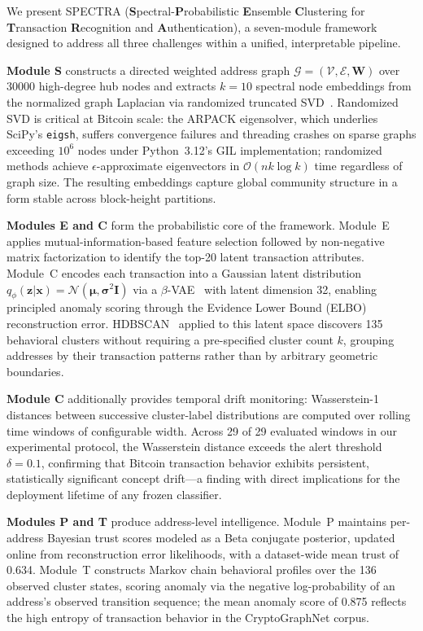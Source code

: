 We present \textsc{SPECTRA}
(\textbf{S}pectral-\textbf{P}robabilistic \textbf{E}nsemble \textbf{C}lustering
for \textbf{T}ransaction \textbf{R}ecognition and \textbf{A}uthentication),
a seven-module framework designed to address all three challenges within a
unified, interpretable pipeline.

\textbf{Module S} constructs a directed weighted address graph
$\mathcal{G} = (\mathcal{V}, \mathcal{E}, \mathbf{W})$ over \num{30000}
high-degree hub nodes and extracts $k=10$ spectral node embeddings from the
normalized graph Laplacian via randomized truncated SVD~\cite{Halko2011}.
Randomized SVD is critical at Bitcoin scale: the ARPACK eigensolver, which
underlies SciPy's \texttt{eigsh}, suffers convergence failures and threading
crashes on sparse graphs exceeding $10^6$ nodes under Python~3.12's GIL
implementation; randomized methods achieve $\epsilon$-approximate
eigenvectors in $\mathcal{O}(nk\log k)$ time regardless of graph size.
The resulting embeddings capture global community structure in a form stable
across block-height partitions.

\textbf{Modules E and C} form the probabilistic core of the framework.
Module~E applies mutual-information-based feature selection followed by
non-negative matrix factorization to identify the top-20 latent transaction
attributes.
Module~C encodes each transaction into a Gaussian latent distribution
$q_\phi(\mathbf{z}|\mathbf{x}) = \mathcal{N}(\boldsymbol{\mu}, \boldsymbol{\sigma}^2\mathbf{I})$
via a $\beta$-VAE~\cite{Kingma2014} with latent dimension \num{32},
enabling principled anomaly scoring through the Evidence Lower Bound (ELBO)
reconstruction error.
HDBSCAN~\cite{McInnes2017} applied to this latent space discovers \num{135}
behavioral clusters without requiring a pre-specified cluster count $k$,
grouping addresses by their transaction patterns rather than by arbitrary
geometric boundaries.

\textbf{Module C} additionally provides temporal drift monitoring: Wasserstein-1
distances between successive cluster-label distributions are computed over
rolling time windows of configurable width.
Across \num{29} of \num{29} evaluated windows in our experimental protocol,
the Wasserstein distance exceeds the alert threshold $\delta = 0.1$,
confirming that Bitcoin transaction behavior exhibits persistent, statistically
significant concept drift---a finding with direct implications for the
deployment lifetime of any frozen classifier.

\textbf{Modules P and T} produce address-level intelligence.
Module~P maintains per-address Bayesian trust scores modeled as a Beta
conjugate posterior, updated online from reconstruction error likelihoods,
with a dataset-wide mean trust of \num{0.634}.
Module~T constructs Markov chain behavioral profiles over the \num{136}
observed cluster states, scoring anomaly via the negative log-probability
of an address's observed transition sequence; the mean anomaly score of
\num{0.875} reflects the high entropy of transaction behavior in the
CryptoGraphNet corpus.


